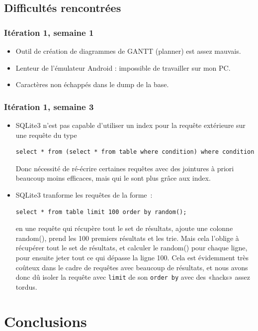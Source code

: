 \documentclass[a4paper,11pt,french]{article}
\begin{document}
\subsection{Difficultés rencontrées}
\subsubsection{Itération 1, semaine 1}
\begin{itemize}
\item Outil de création de diagrammes de GANTT (planner) est assez mauvais.
\item Lenteur de l'émulateur Android : impossible de travailler sur mon PC.%
\item Caractères non échappés dans le dump de la base.%
\end{itemize}

\subsubsection{Itération 1, semaine 3}
\begin{itemize}
\item SQLite3 n'est pas capable d'utiliser un index pour la requête extérieure sur une requête du type
\begin{verbatim}
select * from (select * from table where condition) where condition
\end{verbatim}
Donc nécessité de ré-écrire certaines requêtes avec des jointures à priori beaucoup moins efficaces, mais qui le sont plus grâce aux index.
\item SQLite3 tranforme les requêtes de la forme~:
\begin{verbatim}
select * from table limit 100 order by random();
\end{verbatim}
  en une requête qui récupère tout le set de résultats, ajoute une colonne random(), prend les 100 premiers résultats et les trie. Mais cela
  l'oblige à récupérer tout le set de résultats, et calculer le random() pour chaque ligne, pour ensuite jeter tout ce qui dépasse la ligne
  100. Cela est évidemment très coûteux dans le cadre de requêtes avec beaucoup de résultats, et nous avons donc dû isoler la requête avec
  \verb!limit! de son \verb!order by! avec des «hacks» assez tordus.
\end{itemize}

\section{Conclusions}
\end{document}
